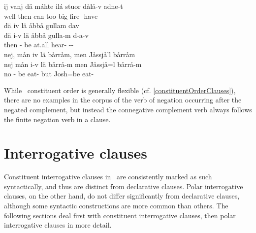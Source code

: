 	ij vanj dä máhte ilá stuor dålå-v adne-t\\
	\BS{} well then can\BS{} too big fire- have-\\\nopagebreak
{} 
\z
\ea\label{negation5}%
\glll	dä iv lä åbbå gullam dav\\
	dä i-v lä åbbå gulla-m d-a-v\\
	then - be\BS{} at.all hear- --\\\nopagebreak
{} 
\z
\ea\label{negation6}%
\glll	nej, mån iv lä bårråm, men Jåssjå'l bårråm\\
	nej mån i-v lä bårrå-m men Jåssjå=l bårrå-m\\
	no  - be\BS{} eat- but Josh\BS{}=be\BS{} eat-\\\nopagebreak
{} 
\z

While \PS\ constituent order is generally flexible (cf. \SEC\ref{constituentOrderClauses}), there are no examples in the corpus of the verb of negation occurring after the negated complement, but instead the connegative complement verb always follows the finite negation verb in a clause. 


\section{Interrogative clauses}\label{interrogClauses}
Constituent interrogative clauses in \PS\ are consistently marked as such syntactically, and thus are distinct from declarative clauses. Polar interrogative clauses, on the other hand, do not differ significantly from declarative clauses, although some syntactic constructions are more common than others. The following sections deal first with constituent interrogative clauses, then polar interrogative clauses in more detail.

